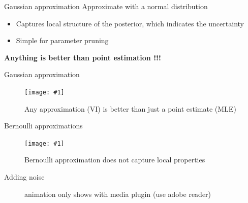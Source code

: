 \documentclass{beamer}
\newcommand{\fitfigure}[1]{\centering\texttt{[image: \#1]}}
\begin{document}
\begin{frame}{Gaussian approximation}
	Approximate with a normal distribution
	\begin{itemize}
		\item Captures local structure of the posterior, which indicates the uncertainty
		\item Simple for parameter pruning
	\end{itemize}
	\centerline{  }
	\textbf{\Huge{Anything is better than point estimation !!!}}
\end{frame}

\begin{frame}{Gaussian approximation}
	\begin{figure}
		\fitfigure{im/approximation.png}
		\caption{Any approximation (VI) is better than just a point estimate (MLE)}
	\end{figure}
\end{frame}

\begin{frame}{Bernoulli approximations}
	\begin{figure}
		\fitfigure{im/gaussian_or_bernoulli.png}
		\caption{Bernoulli approximation does not capture local properties}
	\end{figure}
\end{frame}

\begin{frame}{Adding noise}
	\begin{figure}
		\centering
		\hspace*{-25mm}
		\caption{animation only shows with media plugin (use adobe reader)}
	\end{figure}
\end{frame}
\end{document}
